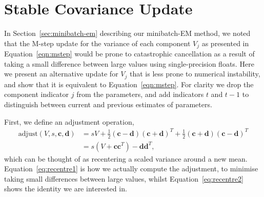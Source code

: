 \documentclass{article}
\newcommand{\bc}{\mathbf{c}}
\newcommand{\bd}{\mathbf{d}}
\begin{document}


\appendix

\section{Stable Covariance Update}
\label{apx:variance-rewrite}

In Section~\ref{sec:minibatch-em} describing our minibatch-EM method, we noted that the M-step update for the variance of each component $V_j$ as presented in Equation~\ref{eqn:mstep} would be prone to catastrophic cancellation as a result of taking a small difference between large values using single-precision floats.
Here we present an alternative update for $V_j$ that is less prone to numerical instability, and show that it is equivalent to Equation~\ref{eqn:mstep}.
For clarity we drop the component indicator $j$ from the parameters, and add indicators $t$ and $t-1$ to distinguish between current and previous estimates of parameters.

First, we define an adjustment operation,
\begin{align}
  \text{adjust}(V, s, \bc, \bd) &= sV + \frac{1}{2}(\bc - \bd)(\bc + \bd)^T + \frac{1}{2}(\bc + \bd)(\bc - \bd)^T  \label{eq:recentre1} \\
  &= s(V + \bc\bc^T) - \bd\bd^T,\label{eq:recentre2}
\end{align}
which can be thought of as recentering a scaled variance around a new mean.
Equation~\ref{eq:recentre1} is how we actually compute the adjustment, to minimise taking small differences between large values, whilst Equation~\ref{eq:recentre2} shows the identity we are interested in.
\end{document}
